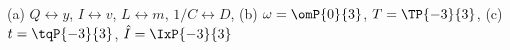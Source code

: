 (a) $Q \leftrightarrow y$, $I \leftrightarrow v$, $L \leftrightarrow m$, $1/C \leftrightarrow D$, (b) $\omega = \omP{0}{3}$, $T = \TP{-3}{3}$, (c) $t = \tqP{-3}{3}$, $\hat I = \IxP{-3}{3}$
